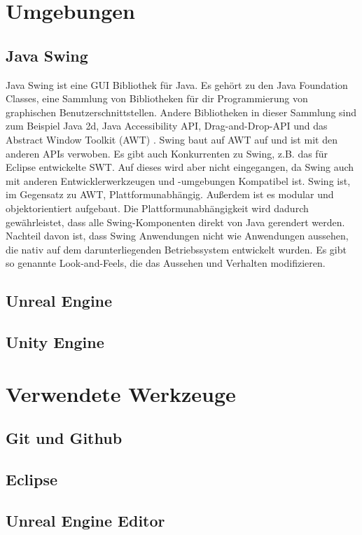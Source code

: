 \documentclass[
	12pt, %
	a4paper,
	listof=totoc, %
	bibliography=totoc, %
	numbers=noenddot, %
	ngerman, %
	headsepline, %
	oneside %
	]{scrbook} %
\begin{document}
\chapter{Umgebungen}\label{sec:Umgebungen}
\section{Java Swing}
Java Swing ist eine \gls{GUI} Bibliothek für Java. Es gehört zu den Java Foundation Classes, eine Sammlung von Bibliotheken für dir Programmierung von graphischen Benutzerschnittstellen. Andere Bibliotheken in dieser Sammlung sind zum Beispiel Java 2d, Java Accessibility API, Drag-and-Drop-API und das Abstract Window Toolkit (AWT) \cite{JFC}. Swing baut auf AWT auf und ist mit den anderen APIs verwoben.  
Es gibt auch Konkurrenten zu Swing, z.B. das für Eclipse entwickelte SWT. Auf dieses wird aber nicht eingegangen, da Swing auch mit anderen Entwicklerwerkzeugen und -umgebungen Kompatibel ist.  
Swing ist, im Gegensatz zu AWT, Plattformunabhängig. Außerdem ist es modular und objektorientiert aufgebaut. Die Plattformunabhängigkeit wird dadurch gewährleistet, dass alle Swing-Komponenten direkt von Java gerendert werden. Nachteil davon ist, dass Swing Anwendungen nicht wie Anwendungen aussehen, die nativ auf dem darunterliegenden Betriebssystem entwickelt wurden.  
Es gibt so genannte \glqq Look-and-Feels\grqq{}, die das Aussehen und Verhalten modifizieren.

\section{Unreal Engine}
\section{Unity Engine}


\chapter{Verwendete Werkzeuge}
\section{Git und Github}
\section{Eclipse}
\section{Unreal Engine Editor}
\end{document}
